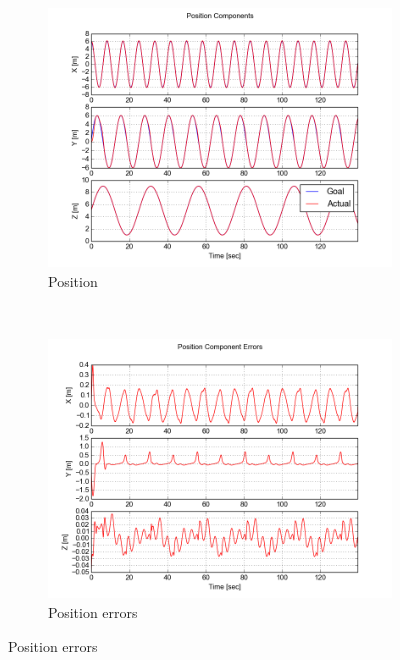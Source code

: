 \documentclass[paper=letter, fontsize=11pt]{scrartcl} %
\numberwithin{equation}{section} %
\numberwithin{figure}{section} %
\numberwithin{table}{section} %
\begin{document}
\begin{figure}[h]
  \centering
  \begin{subfigure}[b]{0.45\textwidth}
    \includegraphics[width=\textwidth]{lissajous_position}
    \caption{Position}
    \label{fig:lissajous_position}
  \end{subfigure}%
  ~ %
  \begin{subfigure}[b]{0.45\textwidth}
    \includegraphics[width=\textwidth]{lissajous_position_errors}
    \caption{Position errors}
    \label{fig:lissajous_position_errors}
  \end{subfigure}


\end{figure}
\end{document}
